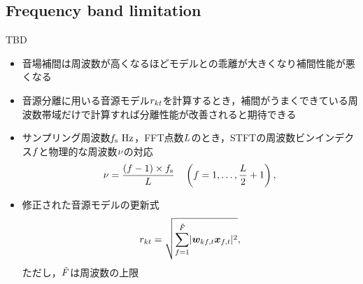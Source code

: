 \documentclass[twocolumn,9pt,dvipdfmx]{article}
\begin{document}
\subsection{Frequency band limitation}
TBD
\begin{itemize}
  \item 音場補間は周波数が高くなるほどモデルとの乖離が大きくなり補間性能が悪くなる \cite{Wakabayashi:2020:ASJ:A}
  \item 音源分離に用いる音源モデル$r _{kt}$を計算するとき，補間がうまくできている周波数帯域だけで計算すれば分離性能が改善されると期待できる
  \item サンプリング周波数$\freqSamp~\unit{\hertz}$，FFT点数$L$のとき，STFTの周波数ビンインデクス$f$と物理的な周波数$\nu$の対応
    \begin{equation}
      \nu = \frac{(f - 1)\times f _{\mathrm{s}}}{L} \quad \left(f = 1, \dots, \frac{L}{2} + 1\right),
    \end{equation}
  \item 修正された音源モデルの更新式
    \begin{equation}
      \var _{\src\tframe} = \sqrt{\sum _{\freq = 1} ^{\SubFreq} \lvert \demix _{\src\ft} \Obs _{\ft} \rvert ^2},
    \end{equation}
    ただし，$\tilde{F}$は周波数の上限
\end{itemize}
\end{document}
